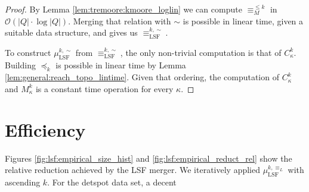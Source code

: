 \begin{proof}
	By Lemma \ref{lem:tremoore:kmoore_loglin} we can compute $\equiv_M^{\leq k}$ in $\mathcal{O}(|Q| \cdot \log |Q|)$. Merging that relation with $\sim$ is possible in linear time, given a suitable data structure, and gives us $\equiv_\text{LSF}^{k,\sim}$.
	
	To construct $\mu_\text{LSF}^{k,\sim}$ from $\equiv_\text{LSF}^{k,\sim}$, the only non-trivial computation is that of $C_\kappa^k$. Building $\preceq_k$ is possible in linear time by Lemma \ref{lem:general:reach_topo_lintime}. Given that ordering, the computation of $C_\kappa^k$ and $M_\kappa^k$ is a constant time operation for every $\kappa$.
\end{proof}


\section{Efficiency} %
Figures \ref{fig:lsf:empirical_size_hist} and \ref{fig:lsf:empirical_reduct_rel} show the relative reduction achieved by the LSF merger. We iteratively applied $\mu_\text{LSF}^{k,\equiv_L}$ with ascending $k$. For the \textsf{detspot} data set, a decent %

